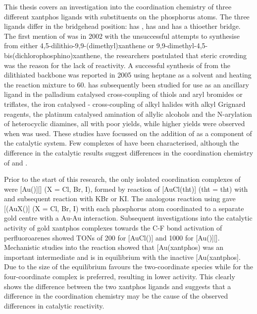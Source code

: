 This thesis covers an investigation into the coordination chemistry of three different xantphos ligands with \tBu{} substituents on the phosphorus atoms.  The three ligands differ in the bridgehead position: \tBuxantphos{} has , \tBusixantphos{} has  and \tButhixantphos{} has a thioether bridge.  The first mention of \tBuxantphos{} was in 2002 with the unsuccessful attempts to synthesise \tBuxantphos{} from either 4,5-dilithio-9,9-(dimethyl)xanthene or 9,9-dimethyl-4,5-bis(dichlorophosphino)xanthene, the researchers postulated that steric crowding was the reason for the lack of reactivity.\cite{Zuideveld2002}  A successful synthesis of \tBuxantphos{} from the dilithiated backbone was reported in 2005 using heptane as a solvent and heating the reaction mixture to 60\degC{}.\cite{Mispelaere2005}  \tBuXantphos{} has subsequently been studied for use as an ancillary ligand in the palladium catalysed cross-coupling of thiols and aryl bromides or triflates, the iron catalysed - cross-coupling of alkyl halides with alkyl Grignard reagents, the platinum catalysed amination of allylic alcohols and the N-arylation of heterocyclic diamines, all with poor yields, while higher yields were observed when \Phxantphos{} was used.\cite{Mispelaere2005, Dongol2007, Ohshima2009, Cabello2007}  These studies have focussed on the addition of \tBuxantphos{} as a component of the catalytic system.  Few complexes of \tBuxantphos{} have been characterised, although the difference in the catalytic results suggest differences in the coordination chemistry of \Phxantphos{} and \tBuxantphos{}.  


Prior to the start of this research, the only isolated coordination complexes of \tBuxantphos{} were [Au(\tBuxantphos)][] (X = Cl, Br, I), formed by reaction of [AuCl(\acrshort{tht})] (\acrshort{tht} = \acrlong{tht}) with \tBuxantphos{} and subsequent reaction with KBr or KI.\cite{Partyka2010}  The analogous reaction using \Phxantphos{} gave [(AuX(\Phxantphos)] (X = Cl, Br, I) with each phosphorus atom coordinated to a separate gold centre with a Au-Au interaction.\cite{Pintado2004, Partyka2010}  Subsequent investigations into the catalytic activity of gold xantphos complexes towards the C-F bond activation of perfluoroarenes showed \glspl{TON} of 200 for [AuCl(\Phxantphos)] and 1000 for [Au(\tBuxantphos)][].\cite{Zhan2012}  Mechanistic studies into the reaction showed that [Au(xantphos)\ce{]+} was an important intermediate and is in equilibrium with the inactive [Au(xantphos].  Due to the size of \tBuxantphos{} the equilibrium favours the two-coordinate species while for \Phxantphos{} the four-coordinate complex is preferred, resulting in lower activity.\cite{Zhan2012}  This clearly shows the difference between the two xantphos ligands and suggests that a difference in the coordination chemistry may be the cause of the observed differences in catalytic reactivity.  

